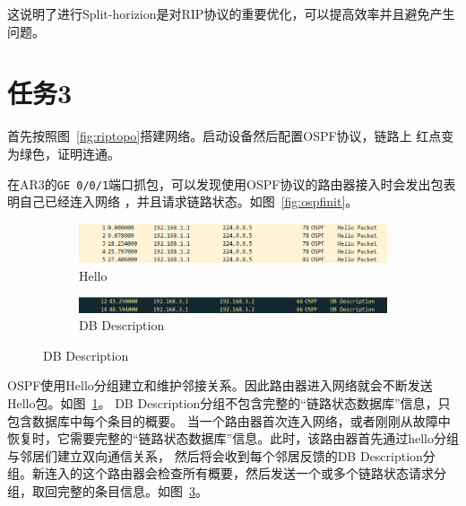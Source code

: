 \documentclass[a4paper,twoside]{article}
\begin{document}
\begin{spacing}{1.2}
这说明了进行Split-horizion是对RIP协议的重要优化，可以提高效率并且避免产生问题。

\section{任务3}

首先按照图~\ref{fig:riptopo}搭建网络。启动设备然后配置OSPF协议，链路上
红点变为绿色，证明连通。

在AR3的\texttt{GE 0/0/1}端口抓包，可以发现使用OSPF协议的路由器接入时会发出包表明自己已经连入网络
，并且请求链路状态。如图~\ref{fig:ospfinit}。
\begin{figure}[H]
	\centering
	\caption{OSPF启动}
	\label{fig:ospfinit}
	\begin{subfigure}{0.4\textwidth}
		\centering
		\includegraphics[width=\textwidth]{hello.png}
		\caption{Hello}
		\label{fig:hello}
	\end{subfigure}
	\begin{subfigure}{0.4\textwidth}
		\centering
		\includegraphics[width=\textwidth]{dbd.png} 
		\caption{DB Description}
		\label{fig:dbdesc}
	\end{subfigure}
\end{figure}

OSPF使用Hello分组建立和维护邻接关系。因此路由器进入网络就会不断发送Hello包。如图~\ref{fig:hello}。
DB Description分组不包含完整的“链路状态数据库”信息，只包含数据库中每个条目的概要。
当一个路由器首次连入网络，或者刚刚从故障中恢复时，它需要完整的“链路状态数据库”信息。此时，该路由器首先通过hello分组与邻居们建立双向通信关系，
然后将会收到每个邻居反馈的DB Description分组。新连入的这个路由器会检查所有概要，然后发送一个或多个链路状态请求分组，取回完整的条目信息。如图~\ref{fig:dbdesc}。


\end{spacing}
\end{document}
